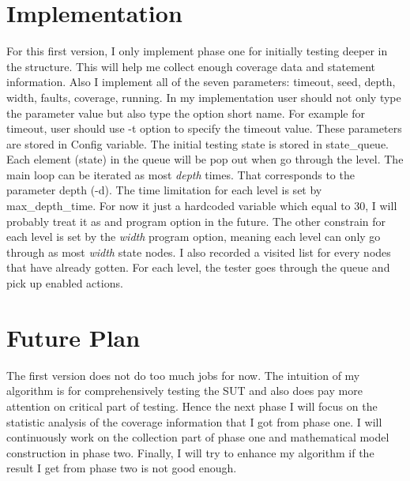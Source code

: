 \documentclass[11pt]{article}
\theoremstyle{plain}
\theoremstyle{definition}
\begin{document}
\section{Implementation}
For this first version, I only implement phase one for initially testing deeper in the structure. This will help me collect enough coverage data and statement information. Also I implement all of the seven parameters: timeout, seed, depth, width, faults, coverage, running. In my implementation user should not only type the parameter value but also type the option short name. For example for timeout, user should use -t option to specify the timeout value. These parameters are stored in Config variable. The initial testing state is stored in state\_queue. Each element (state) in the queue will be pop out when go through the level. The main loop can be iterated as most \textit{depth} times. That corresponds to the parameter depth (-d). The time limitation for each level is set by max\_depth\_time. For now it just a hardcoded variable which equal to 30, I will probably treat it as and program option in the future. The other constrain for each level is set by the \textit{width} program option, meaning each level can only go through as most \textit{width} state nodes. I also recorded a visited list for every nodes that have already gotten. For each level, the tester goes through the queue and pick up enabled actions.

\section{Future Plan}
The first version does not do too much jobs for now. The intuition of my algorithm is for comprehensively testing the SUT and also does pay more attention on critical part of testing. Hence the next phase I will focus on the statistic analysis of the coverage information that I got from phase one. I will continuously work on the collection part of phase one and mathematical model construction in phase two. Finally, I will try to enhance my algorithm if the result I get from phase two is not good enough.
\end{document}
